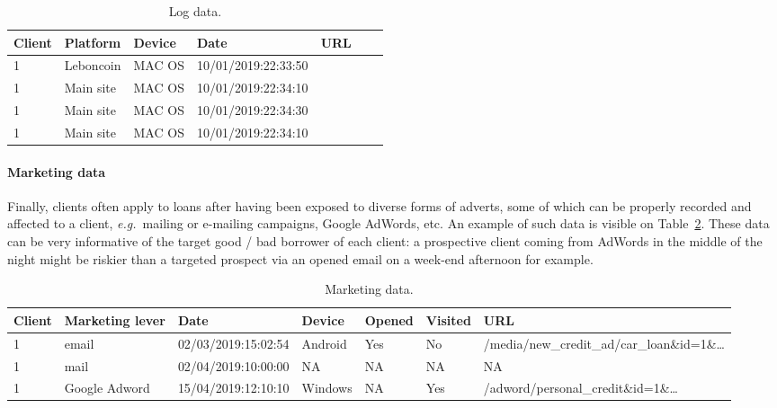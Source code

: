 \begin{table}[ht]
    \centering
    \caption{Log data.}
    \label{tab:log_data}
    \begin{small}
\begin{tabular}{lllllll}
Client & Platform & Device & Date & URL \\
 \hline
1 & Leboncoin & MAC OS & 10/01/2019:22:33:50 &  \\
1 & Main site & MAC OS & 10/01/2019:22:34:10 &  \\
1 & Main site & MAC OS & 10/01/2019:22:34:30 &  \\
1 & Main site & MAC OS & 10/01/2019:22:34:10 &  \\
\end{tabular}
    \end{small}
\end{table}





\paragraph{Marketing data}

Finally, clients often apply to loans after having been exposed to diverse forms of adverts, some of which can be properly recorded and affected to a client, \textit{e.g.}\ mailing or e-mailing campaigns, Google AdWords, etc. An example of such data is visible on Table~\ref{tab:marketing_data}. These data can be very informative of the target good / bad borrower of each client: a prospective client coming from AdWords in the middle of the night might be riskier than a targeted prospect via an opened email on a week-end afternoon for example.

\begin{table}[ht]
    \centering
    \caption{Marketing data.}
    \label{tab:marketing_data}
    \begin{tiny}
\begin{tabular}{lllllll}
Client & Marketing lever & Date & Device & Opened & Visited & URL \\
 \hline
1 & email & 02/03/2019:15:02:54 & Android & Yes & No & /media/new\_credit\_ad/car\_loan\&id=1\&\dots \\
1 & mail & 02/04/2019:10:00:00 & NA & NA & NA & NA \\
1 & Google Adword & 15/04/2019:12:10:10 & Windows & NA & Yes & /adword/personal\_credit\&id=1\&\dots \\
\end{tabular}
    \end{tiny}
\end{table}

